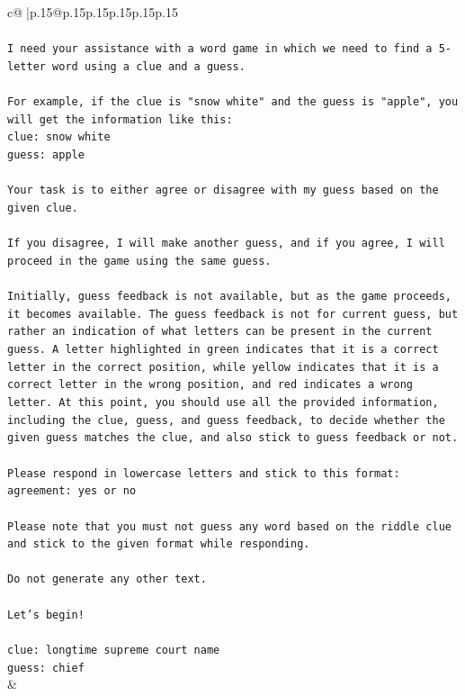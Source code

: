 \documentclass{article}
\begin{document}
{\begin{supertabular}{c@{$\;$}|p{.15\linewidth}@{}p{.15\linewidth}p{.15\linewidth}p{.15\linewidth}p{.15\linewidth}p{.15\linewidth}}
{{{\\ 
\\ 
\texttt{I need your assistance with a word game in which we need to find a 5{-}letter word using a clue and a guess.} \\
\\ 
\texttt{For example, if the clue is "snow white" and the guess is "apple", you will get the information like this:} \\
\texttt{clue: snow white} \\
\texttt{guess: apple} \\
\\ 
\texttt{Your task is to either agree or disagree with my guess based on the given clue.} \\
\\ 
\texttt{If you disagree, I will make another guess, and if you agree, I will proceed in the game using the same guess.} \\
\\ 
\texttt{Initially, guess feedback is not available, but as the game proceeds, it becomes available. The guess feedback is not for current guess, but rather an indication of what letters can be present in the current guess. A letter highlighted in green indicates that it is a correct letter in the correct position, while yellow indicates that it is a correct letter in the wrong position, and red indicates a wrong letter. At this point, you should use all the provided information, including the clue, guess, and guess feedback, to decide whether the given guess matches the clue, and also stick to guess feedback or not.} \\
\\ 
\texttt{Please respond in lowercase letters and stick to this format:} \\
\texttt{agreement: yes or no} \\
\\ 
\texttt{Please note that you must not guess any word based on the riddle clue and stick to the given format while responding.} \\
\\ 
\texttt{Do not generate any other text.} \\
\\ 
\texttt{Let's begin!} \\
\\ 
\texttt{clue: longtime supreme court name} \\
\texttt{guess: chief} \\
            }
        }
    }
    & \\ \\


\end{supertabular}}
\end{document}
